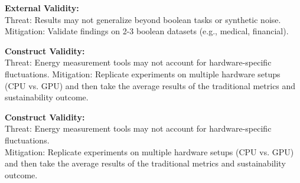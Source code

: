 \documentclass[conference]{IEEEtran}
\begin{document}
\vspace{0.5em}
\textbf{External Validity:}\\
Threat: Results may not generalize beyond boolean tasks or synthetic noise. Mitigation: Validate findings on 2-3 boolean datasets (e.g., medical, financial).

\vspace{0.5em}
\textbf{Construct Validity:}\\
Threat: Energy measurement tools may not account for hardware-specific fluctuations. Mitigation: Replicate experiments on multiple hardware setups (CPU vs. GPU) and then take the average results of the traditional metrics and sustainability outcome.


\textbf{Construct Validity:}\\[0.5em]
Threat: Energy measurement tools may not account for hardware-specific fluctuations.\\[0.5em]
Mitigation: Replicate experiments on multiple hardware setups (CPU vs. GPU) and then take the average results of the traditional metrics and sustainability outcome.





\end{document}
